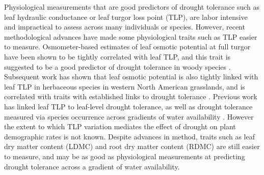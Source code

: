 \documentclass[12pt, letterpaper]{article}
\begin{document}
Physiological measurements that are good predictors of drought tolerance such as leaf hydraulic conductance or leaf turgor loss point (TLP), are labor intensive and impractical to assess across many individuals or species. However, recent methodological advances have made some physiological traits such as TLP easier to measure. Osmometer-based estimates of leaf osmotic potential at full turgor have been shown to be tightly correlated with leaf TLP, and this trait is suggested to be a good predictor of drought tolerance in woody species \citep{Bartlett2012}. Subsequent work has shown that leaf osmotic potential is also tightly linked with leaf TLP in herbaceous species in western North American grasslands, and is correlated with traits with established links to drought tolerance \citep{Griffin-Nolan2019}. Previous work has linked leaf TLP to leaf-level drought tolerance, as well as drought tolerance measured via species occurrence across gradients of water availability \citep{Bartlett2012a,Blumenthal2020,Wilcox2020PlantPrairie}.
However the extent to which TLP variation mediates the effect of drought on plant demographic rates is not known. Despite advances in method, traits such as leaf dry matter content (LDMC) and root dry matter content (RDMC) are still easier to measure, and may be as good as physiological measurements at predicting drought tolerance across a gradient of water availability\citep{Bartlett2012,Griffin-Nolan2019,Blumenthal2020}.
\end{document}
